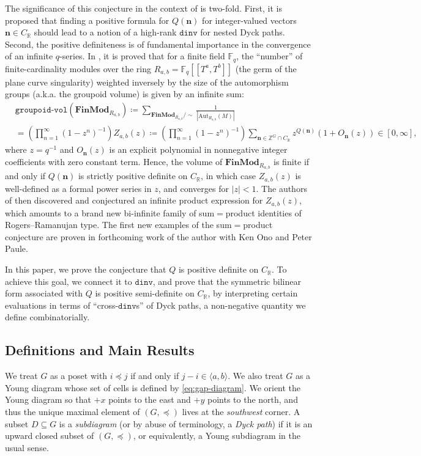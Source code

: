 \documentclass[11pt,reqno]{amsart}
\theoremstyle{remark}
\begin{document}
The significance of this conjecture in the context of \cite{HJO26+} is two-fold. First, it is proposed that finding a positive formula for $Q(\mathbf{n})$ for integer-valued vectors $\mathbf{n}\in C_\mathbb{R}$ should lead to a notion of a high-rank $\mathtt{dinv}$ for nested Dyck paths. Second, the positive definiteness is of fundamental importance in the convergence of an infinite $q$-series. In \cite{HJO26+}, it is proved that for a finite field $\mathbb{F}_q$, the ``number'' of finite-cardinality modules over the ring $R_{a,b}=\mathbb{F}_q[[T^a,T^b]]$ (the germ of the plane curve singularity) weighted inversely by the size of the automorphism groups (a.k.a. the groupoid volume) is given by an infinite sum:
\[ \begin{aligned}
    &\mathtt{groupoid\text{-}vol}(\mathbf{FinMod}_{R_{a,b}})\coloneq\sum_{ \mathbf{FinMod}_{R_{a,b}}/{\sim}} \frac{1}{|\mathrm{Aut}_{R_{a,b}}(M)|} \\
    &=  \left(\prod_{n=1}^\infty (1-z^n)^{-1} \right)Z_{a,b}(z)\coloneqq \left(\prod_{n=1}^\infty (1-z^n)^{-1} \right) \sum_{\mathbf{n}\in \mathbb{Z}^G\cap C_{\mathbb{R}}} z^{Q(\mathbf{n})}(1+O_{\mathbf{n}}(z))\in [0,\infty],
\end{aligned}\]
where $z=q^{-1}$ and $O_{\mathbf{n}}(z)$ is an explicit polynomial in nonnegative integer coefficients with zero constant term. Hence, the volume of $\mathbf{FinMod}_{R_{a,b}}$ is finite if and only if $Q(\mathbf{n})$ is strictly positive definite on $C_\mathbb{R}$, in which case $Z_{a,b}(z)$ is well-defined as a formal power series in $z$, and converges for $|z|<1$. The authors of \cite{HJO26+} then discovered and conjectured an infinite product expression for $Z_{a,b}(z)$, which amounts to a brand new bi-infinite family of sum$=$product identities of Rogers--Ramanujan type. The first new examples of the sum$=$product conjecture are proven in forthcoming work of the author with  Ken Ono and Peter Paule.

In this paper, we prove the conjecture that $Q$ is positive definite on $C_{\mathbb{R}}$. To achieve this goal, we connect it to $\mathtt{dinv}$, and prove that the symmetric bilinear form associated with $Q$ is positive semi-definite on $C_\mathbb{R}$, by interpreting certain evaluations in terms of ``cross-$\mathtt{dinv}$s'' of Dyck paths, a non-negative quantity we define combinatorially.

\subsection{Definitions and Main Results}
We treat $G$ as a poset with $i\preceq j$ if and only if $j-i\in \langle a,b\rangle$. We also treat $G$ as a Young diagram whose set of cells is defined by \eqref{eq:gap-diagram}. We orient the Young diagram so that $+x$ points to the east and $+y$ points to the north, and thus the unique maximal element of $(G,\preceq)$ lives at the \emph{southwest} corner. A subset $D \subseteq G$ is a \emph{subdiagram} (or by abuse of terminology, a \emph{Dyck path}) if it is an upward closed subset of $(G,\preceq)$, or equivalently, a Young subdiagram in the usual sense. 
\end{document}
